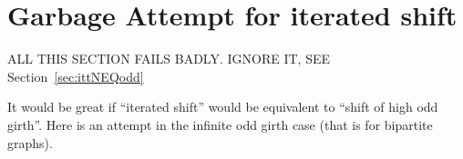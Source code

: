 \documentclass[11pt,a4aper]{article}
\newtheorem{theorem}{Theorem}
\begin{document}



\section{Garbage Attempt for iterated shift}

ALL THIS SECTION FAILS BADLY. IGNORE IT, SEE Section~\ref{sec:ittNEQodd}

It would be great if ``iterated shift'' would be equivalent to ``shift
of high odd girth''.  Here is an attempt in the infinite odd girth
case (that is for bipartite graphs).







\end{document}
